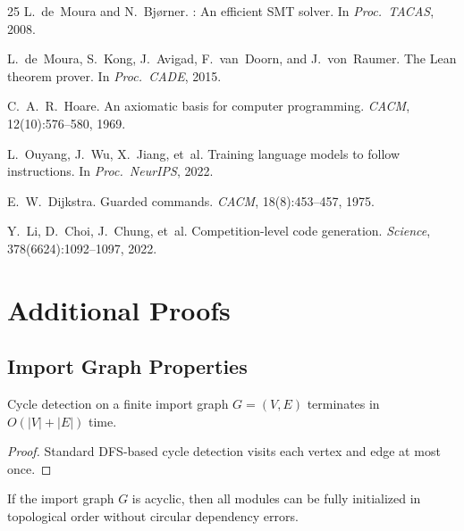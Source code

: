 \documentclass[11pt]{article}
\begin{document}
\begin{thebibliography}{25}
L.~de~Moura and N.~Bj{\o}rner.
: An efficient {SMT} solver.
\newblock In \emph{Proc.\ TACAS}, 2008.

L.~de~Moura, S.~Kong, J.~Avigad, F.~van~Doorn, and J.~von~Raumer.
\newblock The {Lean} theorem prover.
\newblock In \emph{Proc.\ CADE}, 2015.

C.~A.~R.~Hoare.
\newblock An axiomatic basis for computer programming.
\newblock \emph{CACM}, 12(10):576--580, 1969.

L.~Ouyang, J.~Wu, X.~Jiang, et~al.
\newblock Training language models to follow instructions.
\newblock In \emph{Proc.\ NeurIPS}, 2022.

E.~W.~Dijkstra.
\newblock Guarded commands.
\newblock \emph{CACM}, 18(8):453--457, 1975.

Y.~Li, D.~Choi, J.~Chung, et~al.
\newblock Competition-level code generation.
\newblock \emph{Science}, 378(6624):1092--1097, 2022.

\end{thebibliography}

\appendix
\section{Additional Proofs}
\label{app:proofs}

\subsection{Import Graph Properties}
\label{app:import-graph}

\begin{lemma}
\label{lem:cycle-term}
Cycle detection on a finite import graph $G = (V, E)$ terminates
in $O(|V| + |E|)$ time.
\end{lemma}

\begin{proof}
Standard DFS-based cycle detection visits each vertex and edge
at most once.
\end{proof}

\begin{lemma}
\label{lem:acyclic-safe}
If the import graph $G$ is acyclic, then all modules can be
fully initialized in topological order without circular
dependency errors.
\end{lemma}
\end{document}
